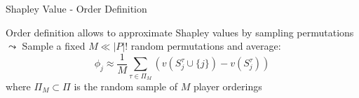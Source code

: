 \documentclass[10pt,compress,t,notes=noshow, xcolor=table]{beamer}
\newcommand{\Stau}{S_{j}^\tau}%
\begin{document}
\begin{framev}[align=top]{Shapley Value - Order Definition}
\begin{itemizeM}
\item<3-> Order definition allows to approximate Shapley values by sampling permutations\\
$\leadsto$ Sample a fixed $M \ll |P|!$ random permutations and average:
$$
\phi_j \approx \frac{1}{M} \sum_{\tau \in \Pi_M} \left(v(\Stau \cup \{j\}) - v(\Stau)\right)
$$
where $\Pi_M \subset \Pi$ is the random sample of $M$ player orderings
\end{itemizeM}
\end{framev}
\end{document}
